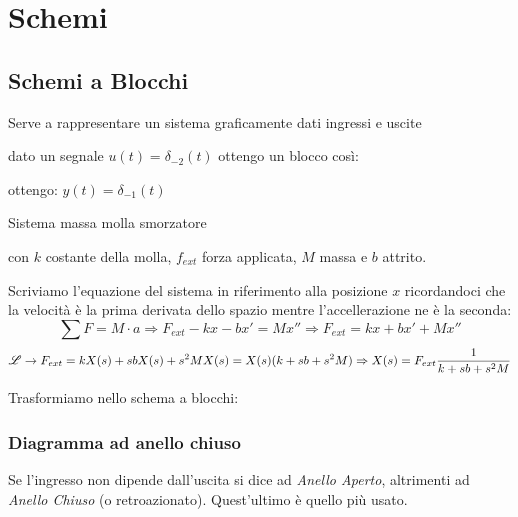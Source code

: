 \chapter{Schemi}
\section{Schemi a Blocchi}
Serve a rappresentare un sistema graficamente dati ingressi e uscite

\begin{example}
	
	dato un segnale $ u(t)=\delta_{-2}(t) $ ottengo un blocco così:
	
	\begin{center}
	
	\end{center}
	ottengo:  $ y(t)=\delta_{-1}(t) $
\end{example}

\begin{example}
	Sistema massa molla smorzatore
	
	\begin{center}
	
	\end{center}

	con $ k $ costante della molla, $ f_{ext} $ forza applicata, $ M $ massa e $ b $ attrito.
	
	Scriviamo l'equazione del sistema in riferimento alla posizione $ x $ ricordandoci che la velocità è la prima derivata dello spazio mentre l'accellerazione ne è la seconda:
	\[
		\sum F = M \cdot a \Rightarrow F_{ext}-kx-bx'= Mx'' \Rightarrow F_{ext}=kx+bx'+ Mx''
	\]
	\[
		\mathscr{L} \rightarrow F_{ext}=kX(s)+sbX(s)+ s^2MX(s) 
		= X(s) (k+sb+s^2M) \Rightarrow X(s)=F_{ext} \frac{1}{k+sb+s^2M}
	\]
	
	Trasformiamo nello schema a blocchi:
	
	\begin{center}
	
	\end{center}
\end{example}

\subsection{Diagramma ad anello chiuso}

Se l'ingresso non dipende dall'uscita si dice ad \emph{Anello Aperto}, altrimenti ad \emph{Anello Chiuso} (o retroazionato). Quest'ultimo è quello più usato.

